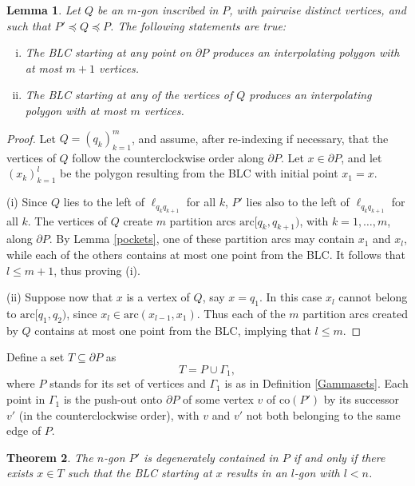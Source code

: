 \documentclass[11pt]{amsart}
\newtheorem{theorem}{Theorem}[section]
\newtheorem{lemma}[theorem]{Lemma}
\theoremstyle{remark}
\numberwithin{equation}{section}
\newcommand{\co}{\mathrm{co}}
\newcommand{\arc}{\mathrm{arc}}
\renewcommand{\precsim}{\preccurlyeq}
\renewcommand{\leq}{\leqslant}
\begin{document}
 

\begin{lemma}\label{m+1verticeslemma}
Let $Q$ be an $m$-gon inscribed in $P$, with pairwise distinct vertices,  and such that  $P'\precsim Q\precsim P$. The following statements are true:
\begin{enumerate}[(i)]
\item
The BLC starting at any point on $\partial P$ produces an interpolating polygon with at most $m+1$ vertices.
\item
The BLC starting at any of the vertices of $Q$ produces an interpolating polygon  with at most $m$ vertices. 
\end{enumerate} 
\end{lemma}

\begin{proof} 
Let $Q=(q_k)_{k=1}^m$, and assume, after re-indexing if necessary,  that the vertices of $Q$ follow the counterclockwise order along $\partial P$. Let $x\in \partial P$, and let $(x_k)_{k=1}^l$ be the polygon resulting from the BLC with initial point $x_1=x$.

(i)  Since $Q$ lies to the left of $\ell_{q_kq_{k+1}}$ for all $k$, $P'$  lies also to the left of $\ell_{q_kq_{k+1}}$ for all $k$.  The vertices of $Q$ create $m$ partition arcs  $\arc[q_k,q_{k+1})$, with $k=1,\ldots,m$, along $\partial P$. By Lemma \ref{pockets}, one of these partition arcs may contain $x_1$ and $x_l$, while each of the others contains at most one point from the BLC.  It follows that $l\leq m+1$, thus proving (i). 
 
 (ii) Suppose now that $x$ is a vertex of $Q$, say $x=q_1$. In this case $x_l$ cannot belong to  $\arc[q_1,q_2)$, since   $x_l\in \arc(x_{l-1},x_1)$.  Thus each of the $m$ partition arcs created by $Q$  contains at most one point from the BLC, implying that $l\leq m$.
\end{proof}





Define a set  $T\subseteq \partial P$ as 
\[
T= P\cup \Gamma_1,
\]
where  $P$ stands for its set of vertices and $\Gamma_1$ is as in Definition \ref{Gammasets}. 
Each point in  $\Gamma_1$ is the push-out onto $\partial P $ of some vertex $v$ of $\co(P')$ by its successor $v'$ (in the counterclockwise order), with $v$ and $v'$ not both belonging to the same  edge of $P$. 



\begin{theorem}\label{degeneracytestthm} 
The $n$-gon $P'$ is degenerately contained in $P$ if and only if there exists $x\in T$ such that the BLC starting at $x$ results in an $l$-gon with $l<n$.
\end{theorem}
\end{document}

